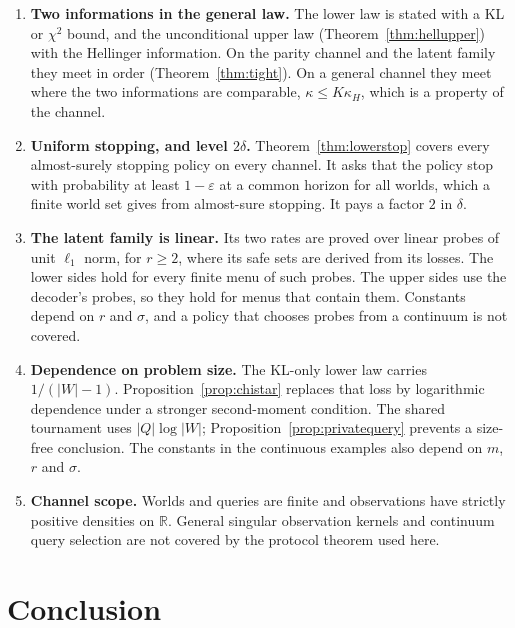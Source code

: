 \begin{enumerate}
\item[1)] \textbf{Two informations in the general law.} The lower law is stated with a KL or
$\chi^{2}$ bound, and the unconditional upper law (Theorem~\ref{thm:hellupper}) with the
Hellinger information. On the parity channel and the latent family they meet in order
(Theorem~\ref{thm:tight}). On a general channel they meet where the two informations are
comparable, $\kappa\le K\kappa_{H}$, which is a property of the channel.
\item[2)] \textbf{Uniform stopping, and level $2\delta$.} Theorem~\ref{thm:lowerstop} covers
every almost-surely stopping policy on every channel. It asks that the policy stop with
probability at least $1-\varepsilon$ at a common horizon for all worlds, which a finite world set
gives from almost-sure stopping. It pays a factor $2$ in $\delta$.
\item[3)] \textbf{The latent family is linear.} Its two rates are proved over linear probes of
unit $\ell_{1}$ norm, for $r\ge2$, where its safe sets are derived from its losses. The lower
sides hold for every finite menu of such probes. The upper sides use the decoder's probes, so
they hold for menus that contain them. Constants depend on $r$ and $\sigma$, and a policy that
chooses probes from a continuum is not covered.
\item[4)] \textbf{Dependence on problem size.} The KL-only lower law carries
$1/(|W|-1)$. Proposition~\ref{prop:chistar} replaces that loss by logarithmic dependence
under a stronger second-moment condition. The shared tournament uses $|Q|\log|W|$;
Proposition~\ref{prop:privatequery} prevents a size-free conclusion. The constants in the
continuous examples also depend on $m$, $r$ and $\sigma$.
\item[5)] \textbf{Channel scope.} Worlds and queries are finite and observations have strictly
positive densities on $\mathbb R$. General singular observation kernels and continuum query
selection are not covered by the protocol theorem used here.
\end{enumerate}

\section{Conclusion}

